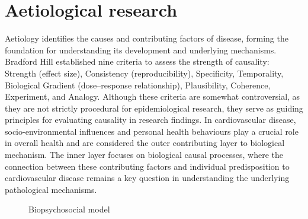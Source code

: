 \documentclass[
  a4paper,
  headsepline=true,
  open=any]{scrbook}
\begin{document}
\hypertarget{aetiological-research}{%
\section{Aetiological research}\label{aetiological-research}}

Aetiology identifies the causes and contributing factors of disease,
forming the foundation for understanding its development and underlying
mechanisms. Bradford Hill established nine criteria to assess the
strength of causality: Strength (effect size), Consistency
(reproducibility), Specificity, Temporality, Biological Gradient
(dose--response relationship), Plausibility, Coherence, Experiment, and
Analogy. Although these criteria are somewhat controversial, as they are
not strictly procedural for epidemiological research, they serve as
guiding principles for evaluating causality in research findings. In
cardiovascular disease, socio-environmental influences and personal
health behaviours play a crucial role in overall health and are
considered the outer contributing layer to biological mechanism. The
inner layer focuses on biological causal processes, where the connection
between these contributing factors and individual predisposition to
cardiovascular disease remains a key question in understanding the
underlying pathological mechanisms.

\begin{figure}

\begin{minipage}[t]{\linewidth}

{\centering 


\caption{Biopsychosocial model}

}

\end{minipage}%

\end{figure}
\end{document}
